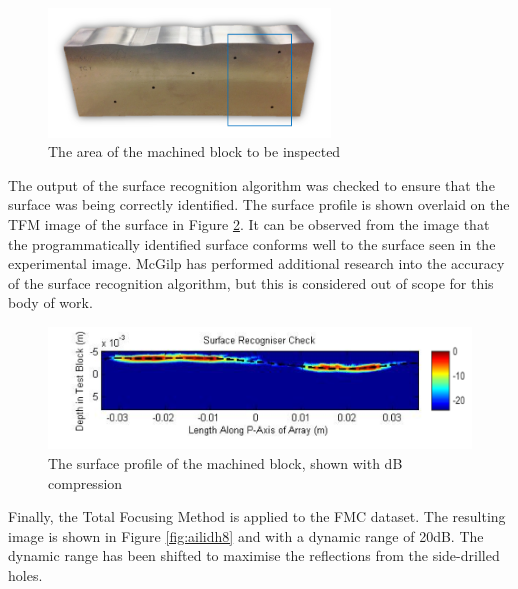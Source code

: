 \begin{figure}[htbp!]
\centering
		\includegraphics[width=75mm]{ailidh6.png}
		\caption{The area of the machined block to be inspected}
		\label{fig:ailidh6}
\end{figure}

The output of the surface recognition algorithm was checked to ensure that the surface was being correctly identified. The surface profile is shown overlaid on the TFM image of the surface in Figure \ref{fig:ailidh7}. It can be observed from the image that the programmatically identified surface conforms well to the surface seen in the experimental image. McGilp has performed additional research into the accuracy of the surface recognition algorithm, but this is considered out of scope for this body of work\cite{mcgilp_adaptation_2016}.

\begin{figure}[htbp!]
\centering
		\includegraphics[width=\textwidth]{ailidh7_bar.png}
		\caption{The surface profile of the machined block, shown with dB compression}
		\label{fig:ailidh7}
\end{figure}

Finally, the Total Focusing Method is applied to the FMC dataset. The resulting image is shown in Figure \ref{fig:ailidh8} and with a dynamic range of 20dB. The dynamic range has been shifted to maximise the reflections from the side-drilled holes.

